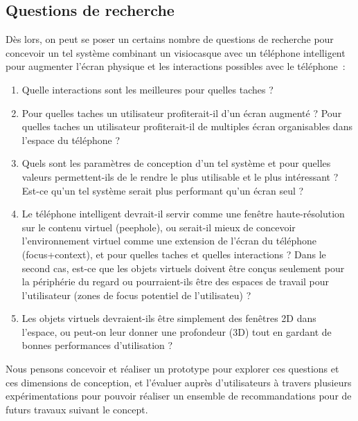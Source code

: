 \subsection*{Questions de recherche}
Dès lors, on peut se poser un certains nombre de questions de recherche pour concevoir un tel système combinant un visiocasque avec un téléphone intelligent pour augmenter l'écran physique et les interactions possibles avec le téléphone~:
\begin{enumerate}
	\item Quelle interactions sont les meilleures pour quelles taches ?
	\item Pour quelles taches un utilisateur profiterait-il d'un écran augmenté ? Pour quelles taches un utilisateur profiterait-il de multiples écran organisables dans l'espace du téléphone ?
	\item Quels sont les paramètres de conception d'un tel système et pour quelles valeurs permettent-ils de le rendre le plus utilisable et le plus intéressant ? Est-ce qu'un tel système serait plus performant qu'un écran seul ?
	\item Le téléphone intelligent devrait-il servir comme une fenêtre haute-résolution sur le contenu virtuel (\foreignlanguage{english}{peephole}), ou serait-il mieux de concevoir l'environnement virtuel comme une extension de l'écran du téléphone (focus+context), et pour quelles taches et quelles interactions ? Dans le second cas, est-ce que les objets virtuels doivent être conçus seulement pour la périphérie du regard ou pourraient-ils être des espaces de travail pour l'utilisateur (zones de focus potentiel de l'utilisateu) ?
	\item Les objets virtuels devraient-ils être simplement des fenêtres 2D dans l'espace, ou peut-on leur donner une profondeur (3D) tout en gardant de bonnes performances d'utilisation ?
\end{enumerate}

Nous pensons concevoir et réaliser un prototype pour explorer ces questions et ces dimensions de conception, et l'évaluer auprès d'utilisateurs à travers plusieurs expérimentations pour pouvoir réaliser un ensemble de recommandations pour de futurs travaux suivant le concept.




